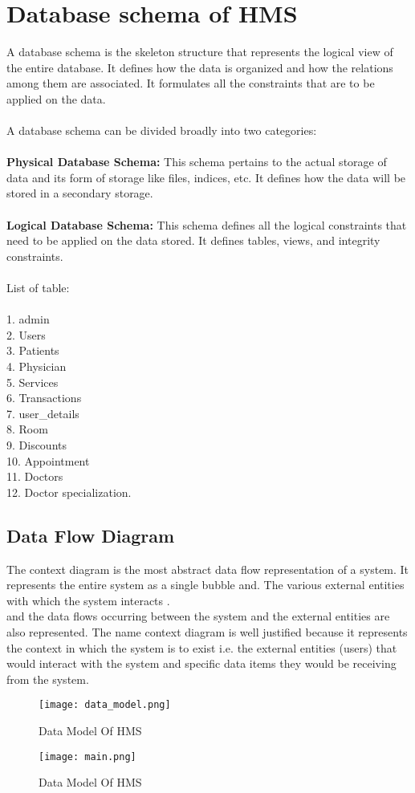 \documentclass{article}
\begin{document}
\newpage
\section{Database schema of HMS}
A database schema is the skeleton structure that represents the logical view of the entire database. It defines how the data is organized and how the relations among them are associated. It formulates all the constraints that are to be applied on the data.\\\\
A database schema can be divided broadly into two categories:\\\\
\textbf{Physical Database Schema:}  This schema pertains to the actual storage of data and its form of storage like files, indices, etc. It defines how the data will be stored in a secondary storage. \\\\
\textbf{Logical Database Schema:}  This schema defines all the logical constraints that need to be applied on the data stored. It defines tables, views, and integrity constraints. \\\\
List of table: \\\\
1.	admin \\
2.	Users \\
3.	Patients\\ 
4.	Physician \\ 
5.	Services \\
6.	Transactions\\ 
7.	user_details \\
8.	Room \\
9.	Discounts \\
10.	Appointment \\
11.	Doctors \\
12.	Doctor specialization.\\

\subsection{Data Flow Diagram }
The context diagram is the most abstract data flow representation of a system. It represents the entire system as a single bubble and. The various external entities with which the system interacts .\\
and the data flows occurring between the system and the external entities are also represented. The name context diagram is well justified because it represents the context in which the system is to exist i.e. the external entities (users) that would interact with the system and specific data items they would be receiving from the system. 
\begin{figure}[htp]
    \centering
    \texttt{[image: data\_model.png]}
    \caption{Data Model Of HMS }
    \label{fig:Data Model Diagram Of HMS  }
\end{figure}
\begin{figure}[htp]
    \centering
    \texttt{[image: main.png]}
    \caption{Data Model Of HMS }
    \label{fig:Data Model Diagram Of HMS  }
\end{figure}
\end{document}
